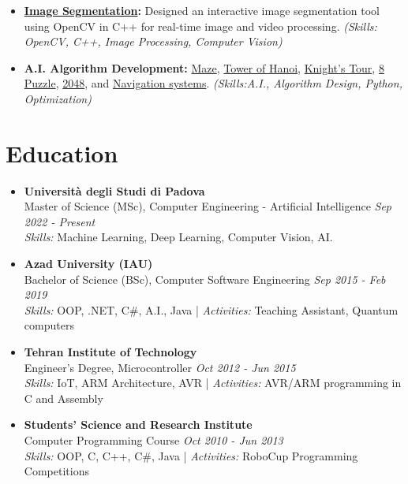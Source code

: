\documentclass[a4paper]{article}
\begin{document}
\begin{itemize}[left=0pt]
    \item \textbf{\href{https://github.com/PooyaNasiri/image-segmenter}{Image Segmentation}:} Designed an interactive image segmentation tool using OpenCV in C++ for real-time image and video processing. \textit{(Skills: OpenCV, C++, Image Processing, Computer Vision)}

   \item \textbf{A.I. Algorithm Development:} 
\href{https://github.com/PooyaNasiri/maze}{Maze}, 
\href{https://github.com/PooyaNasiri/tower-of-hanoi}{Tower of Hanoi}, 
\href{https://github.com/PooyaNasiri/knights-tour}{Knight's Tour}, 
\href{https://github.com/PooyaNasiri/8Puzzle}{8 Puzzle}, 
\href{https://github.com/PooyaNasiri/2048}{2048}, and 
\href{https://github.com/PooyaNasiri/Navigator}{Navigation systems}. 
\textit{(Skills:A.I., Algorithm Design, Python, Optimization)}
\end{itemize}


\section*{Education}
\begin{itemize}[left=0pt]
    \item \textbf{Università degli Studi di Padova} \\
    Master of Science (MSc), Computer Engineering - Artificial Intelligence \hfill \textit{Sep 2022 - Present} \\
    \textit{Skills:} Machine Learning, Deep Learning, Computer Vision, AI.
    
    \item \textbf{Azad University (IAU)} \\
    Bachelor of Science (BSc), Computer Software Engineering \hfill \textit{Sep 2015 - Feb 2019} \\
    \textit{Skills:} OOP, .NET, C\#, A.I., Java  |  \textit{Activities:} Teaching Assistant, Quantum computers

    \item \textbf{Tehran Institute of Technology} \\
    Engineer's Degree, Microcontroller \hfill \textit{Oct 2012 - Jun 2015} \\
    \textit{Skills:} IoT, ARM Architecture, AVR  | \textit{Activities:} AVR/ARM programming in C and Assembly

    \item \textbf{Students' Science and Research Institute} \\
    Computer Programming Course \hfill \textit{Oct 2010 - Jun 2013} \\
    \textit{Skills:} OOP, C, C++, C\#, Java  | \textit{Activities:} RoboCup Programming Competitions
\end{itemize}
\end{document}
